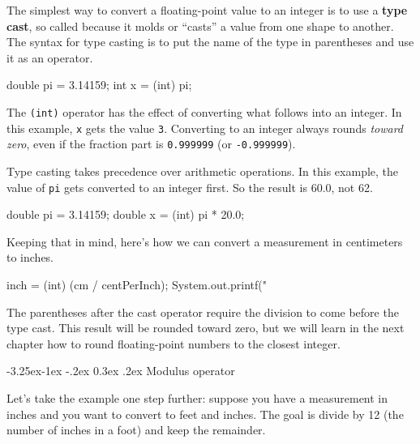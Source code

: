 \documentclass[12pt]{book}
\makeatletter
\theoremstyle{exercise}
\newcommand{\java}[1]{\verb"#1"}
\renewcommand\subsection{\@startsection{subsection}{2}{\z@}%
    {-3.25ex\@plus -1ex \@minus -.2ex}%
    {0.3ex \@plus .2ex}%
    {\normalfont\large\bfseries}}
\newcommand{\java}[1]{\lstinline{#1}} %
\makeatother
\begin{document}

The simplest way to convert a floating-point value to an integer is to use a {\bf type cast}, so called because it molds or ``casts'' a value from one shape to another.
The syntax for type casting is to put the name of the type in parentheses and use it as an operator.

\begin{code}
    double pi = 3.14159;
    int x = (int) pi;
\end{code}


The \java{(int)} operator has the effect of converting what follows into an integer.
In this example, \java{x} gets the value \java{3}.
Converting to an integer always rounds {\em toward zero}, even if the fraction part is \java{0.999999} (or \java{-0.999999}).

Type casting takes precedence over arithmetic operations.
In this example, the value of \java{pi} gets converted to an integer first.
So the result is 60.0, not 62.

\begin{code}
    double pi = 3.14159;
    double x = (int) pi * 20.0;
\end{code}


Keeping that in mind, here's how we can convert a measurement in centimeters to inches.

\begin{code}
    inch = (int) (cm / centPerInch);
    System.out.printf("%
\end{code}

The parentheses after the cast operator require the division to come before the type cast.
This result will be rounded toward zero, but we will learn in the next chapter how to round floating-point numbers to the closest integer.

\subsection{Modulus operator}

Let's take the example one step further: suppose you have a measurement in inches and you want to convert to feet and inches.
The goal is divide by 12 (the number of inches in a foot) and keep the remainder.

\end{document}
